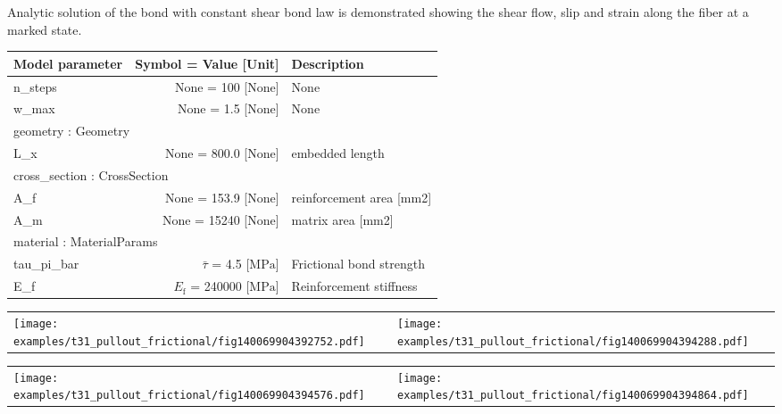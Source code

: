 \documentclass[main.tex]{subfiles}
\begin{document}
\begin{bmcsexample}
\noindent Analytic solution of the bond with constant shear
    bond law is demonstrated showing the shear flow, slip and strain
    along the fiber at a marked state.
 \\[3mm]
\begin{center}
\begin{tabular}{lrp{4cm}}\hline
Model parameter & Symbol = Value [Unit] & Description  \\\hline \hline
n\_steps & None = 100 [None] & {\footnotesize None}  \\
            w\_max & None = 1.5 [None] & {\footnotesize None}  \\
            \hline
\multicolumn{3}{l}{geometry : Geometry}\\ \hline

L\_x & None = 800.0 [None] & {\footnotesize embedded length}  \\
            \hline
\multicolumn{3}{l}{cross\_section : CrossSection}\\ \hline

A\_f & None = 153.9 [None] & {\footnotesize reinforcement area [mm2]}  \\
            A\_m & None = 15240 [None] & {\footnotesize matrix area [mm2]}  \\
            \hline
\multicolumn{3}{l}{material : MaterialParams}\\ \hline

tau\_pi\_bar & $\bar{\tau}$ = 4.5 [$\mathrm{MPa}$] & {\footnotesize Frictional bond strength}  \\
            E\_f & $E_\mathrm{f}$ = 240000 [$\mathrm{MPa}$] & {\footnotesize Reinforcement stiffness}  \\
            \hline \end{tabular}


\end{center}

\noindent
\begin{tabular}{L{7.5cm}L{7.5cm}}
\texttt{[image: examples/t31\_pullout\_frictional/fig140069904392752.pdf]}
 & 
\texttt{[image: examples/t31\_pullout\_frictional/fig140069904394288.pdf]}
 \\\end{tabular}

\noindent
\begin{tabular}{L{7.5cm}L{7.5cm}}
\texttt{[image: examples/t31\_pullout\_frictional/fig140069904394576.pdf]}
 & 
\texttt{[image: examples/t31\_pullout\_frictional/fig140069904394864.pdf]}
 \\\end{tabular}

\end{bmcsexample}
\end{document}
